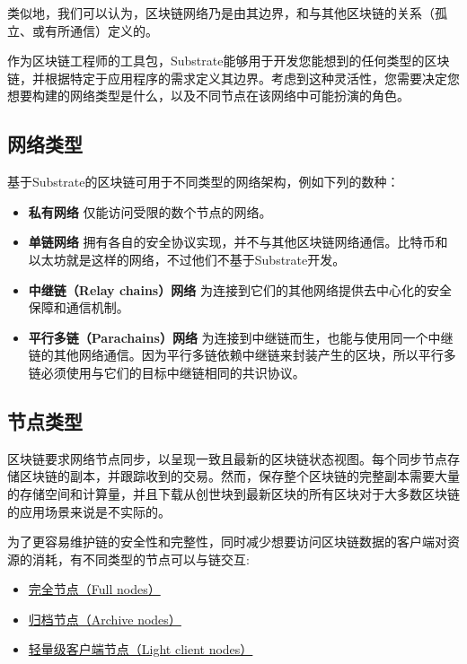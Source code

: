 类似地，我们可以认为，区块链网络乃是由其边界，和与其他区块链的关系（孤立、或有所通信）定义的。

作为区块链工程师的工具包，Substrate能够用于开发您能想到的任何类型的区块链，并根据特定于应用程序的需求定义其边界。考虑到这种灵活性，您需要决定您想要构建的网络类型是什么，以及不同节点在该网络中可能扮演的角色。

\hypertarget{ux7f51ux7edcux7c7bux578b}{%
\subsection{网络类型}\label{ux7f51ux7edcux7c7bux578b}}

基于Substrate的区块链可用于不同类型的网络架构，例如下列的数种：

\begin{itemize}
\item
  \textbf{私有网络} 仅能访问受限的数个节点的网络。
\item
  \textbf{单链网络}
  拥有各自的安全协议实现，并不与其他区块链网络通信。比特币和以太坊就是这样的网络，不过他们不基于Substrate开发。
\item
  \textbf{中继链（Relay chains）网络}
  为连接到它们的其他网络提供去中心化的安全保障和通信机制。
\item
  \textbf{平行多链（Parachains）网络}
  为连接到中继链而生，也能与使用同一个中继链的其他网络通信。因为平行多链依赖中继链来封装产生的区块，所以平行多链必须使用与它们的目标中继链相同的共识协议。
\end{itemize}

\hypertarget{ux8282ux70b9ux7c7bux578b}{%
\subsection{节点类型}\label{ux8282ux70b9ux7c7bux578b}}

区块链要求网络节点同步，以呈现一致且最新的区块链状态视图。每个同步节点存储区块链的副本，并跟踪收到的交易。然而，保存整个区块链的完整副本需要大量的存储空间和计算量，并且下载从创世块到最新区块的所有区块对于大多数区块链的应用场景来说是不实际的。

为了更容易维护链的安全性和完整性，同时减少想要访问区块链数据的客户端对资源的消耗，有不同类型的节点可以与链交互:

\begin{itemize}
\item
  \protect\hyperlink{}{完全节点（Full nodes）}
\item
  \protect\hyperlink{}{归档节点（Archive nodes）}
\item
  \protect\hyperlink{}{轻量级客户端节点（Light client nodes）}
\end{itemize}

